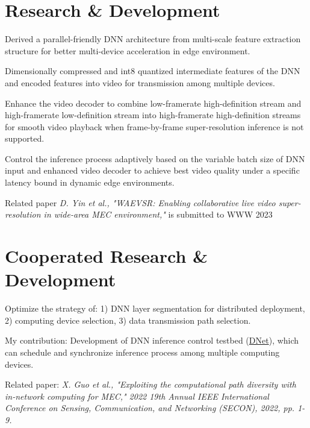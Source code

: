 \documentclass[]{deedy-resume-openfont}
\begin{document}
\begin{minipage}[t]{0.77\textwidth} 


\section{Research \& Development}
\vspace{\topsep}
\begin{tightemize}
    \item Derived a parallel-friendly DNN architecture from multi-scale feature extraction structure for better multi-device acceleration in edge environment. %
    \item Dimensionally compressed and int8 quantized intermediate features of the DNN and encoded features into video for transmission among multiple devices. %
    \item Enhance the video decoder to combine low-framerate high-definition stream and high-framerate low-definition stream into high-framerate high-definition streams for smooth video playback when frame-by-frame super-resolution inference is not supported. %
    \item Control the inference process adaptively based on the variable batch size of DNN input and enhanced video decoder to achieve best video quality under a specific latency bound in dynamic edge environments.
    \item Related paper \textit{D. Yin et al., "WAEVSR: Enabling collaborative live video super-resolution in wide-area MEC environment,"} is submitted to WWW 2023
\end{tightemize}
\sectionsep


\section{Cooperated Research \& Development}
\begin{tightemize}
    \item Optimize the strategy of: 1) DNN layer segmentation for distributed deployment, 2) computing device selection, 3) data transmission path selection.
    \item My contribution: Development of DNN inference control testbed (\href{https://github.com/yindaheng98/DNet}{DNet}), which can schedule and synchronize inference process among multiple computing devices.
    \item Related paper: \textit{X. Guo et al., "Exploiting the computational path diversity with in-network computing for MEC," 2022 19th Annual IEEE International Conference on Sensing, Communication, and Networking (SECON), 2022, pp. 1-9.}
\end{tightemize}
\sectionsep


\end{minipage}
\end{document}
